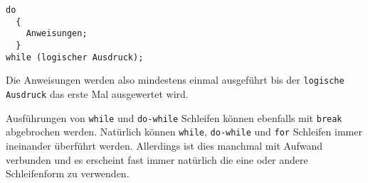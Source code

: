 \begin{minipage}{\linewidth}
\begin{lstlisting}[caption={do-while Schleife}, belowcaptionskip=0.3em]
do
  {
    Anweisungen;
  }
while (logischer Ausdruck);
\end{lstlisting}
\end{minipage}
Die Anweisungen werden also mindestens einmal ausgeführt bis der \texttt{logische Ausdruck} das erste Mal ausgewertet wird.

Ausführungen von \verb|while| und \verb|do-while| Schleifen können ebenfalls mit \verb|break| abgebrochen werden.
Natürlich können \verb|while|, \verb|do-while| und \verb|for| Schleifen immer ineinander überführt werden.
Allerdings ist dies manchmal mit Aufwand verbunden und es erscheint fast immer natürlich die eine oder andere Schleifenform zu verwenden.
\endinput
